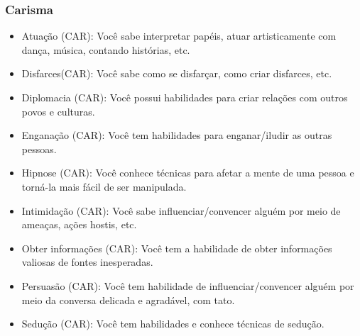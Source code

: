 \subsubsection*{Carisma}
\begin{itemize}
	\item Atuação (CAR): Você sabe interpretar papéis, atuar artisticamente com dança, música, contando histórias, etc.
	\item Disfarces(CAR): Você sabe como se disfarçar, como criar disfarces, etc.
	\item Diplomacia (CAR): Você possui habilidades para criar relações com outros povos e culturas.
	\item Enganação (CAR): Você tem habilidades para enganar/iludir as outras pessoas.
	\item Hipnose (CAR): Você conhece técnicas para afetar a mente de uma pessoa e torná-la mais fácil de ser manipulada.
	\item Intimidação (CAR): Você sabe influenciar/convencer alguém por meio de ameaças, ações hostis, etc.
	\item Obter informações (CAR): Você tem a habilidade de obter informações valiosas de fontes inesperadas.
	\item Persuasão (CAR): Você tem habilidade de influenciar/convencer alguém por meio da conversa delicada e agradável, com tato. 
	\item Sedução (CAR): Você tem habilidades e conhece técnicas de sedução.
\end{itemize}

